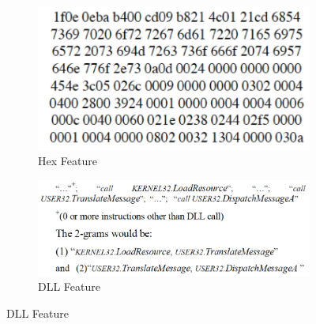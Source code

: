 \documentclass[11pt]{article}
\begin{document}
\begin{figure}[htbp]
\centering
\begin{subfigure}[htbp]{0.4\columnwidth}
\includegraphics*[width=\textwidth]{fig/hex}
\caption{Hex Feature}
\label{fig:hex}
\end{subfigure}
\hfill
\begin{subfigure}[htbp]{0.57\columnwidth}
\includegraphics*[width=\textwidth]{fig/DLL}
\caption{DLL Feature}
\label{fig:DLL}
\end{subfigure}
\label{fig:hexDLL}
\end{figure}


\end{document}
